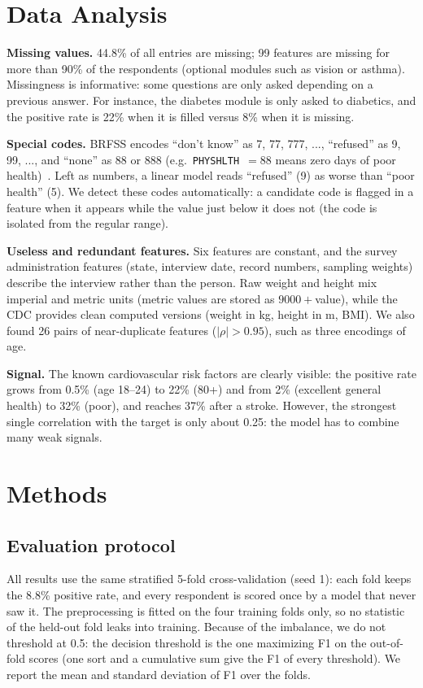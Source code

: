 \documentclass[10pt,conference,compsocconf]{IEEEtran}
\begin{document}
\section{Data Analysis}
\label{sec:data}

\textbf{Missing values.} 44.8\% of all entries are missing; 99 features are
missing for more than 90\% of the respondents (optional modules such as vision
or asthma). Missingness is informative: some questions are only asked
depending on a previous answer. For instance, the diabetes module is only
asked to diabetics, and the positive rate is 22\% when it is filled versus 8\%
when it is missing.

\textbf{Special codes.} BRFSS encodes ``don't know'' as 7, 77, 777, ...,
``refused'' as 9, 99, ..., and ``none'' as 88 or 888 (e.g.\
\texttt{PHYSHLTH}~$=88$ means zero days of poor health)~\cite{codebook}. Left
as numbers, a linear model reads ``refused'' (9) as worse than ``poor
health'' (5). We detect these codes automatically: a candidate code is
flagged in a feature when it appears while the value just below it does not
(the code is isolated from the regular range).

\textbf{Useless and redundant features.} Six features are constant, and the
survey administration features (state, interview date, record numbers,
sampling weights) describe the interview rather than the person. Raw weight
and height mix imperial and metric units (metric values are stored as
$9000+$value), while the CDC provides clean computed versions (weight in kg,
height in m, BMI). We also found 26 pairs of near-duplicate features
($|\rho| > 0.95$), such as three encodings of age.

\textbf{Signal.} The known cardiovascular risk factors are clearly visible:
the positive rate grows from 0.5\% (age 18--24) to 22\% (80+) and from 2\%
(excellent general health) to 32\% (poor), and reaches 37\% after a stroke.
However, the strongest single correlation with the target is only about
0.25: the model has to combine many weak signals.

\section{Methods}

\subsection{Evaluation protocol}

All results use the same stratified 5-fold cross-validation (seed 1): each
fold keeps the 8.8\% positive rate, and every respondent is scored once by a
model that never saw it. The preprocessing is fitted on the four training
folds only, so no statistic of the held-out fold leaks into training. Because
of the imbalance, we do not threshold at 0.5: the decision threshold is the
one maximizing F1 on the out-of-fold scores (one sort and a cumulative sum
give the F1 of every threshold). We report the mean and standard deviation of
F1 over the folds.
\end{document}
